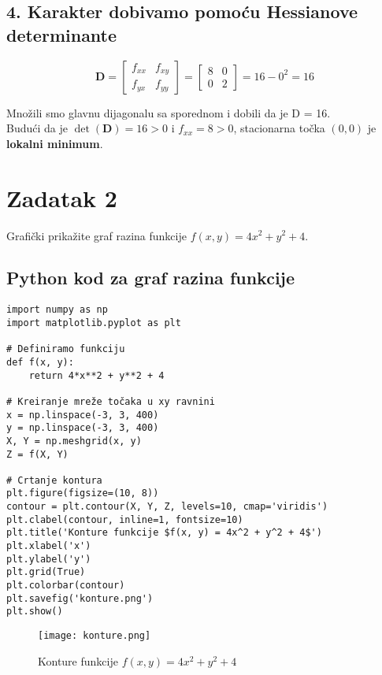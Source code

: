 \documentclass{article}
\begin{document}
\subsection*{4. Karakter dobivamo pomoću Hessianove determinante}

\[
\mathbf{D} = \begin{bmatrix}
f_{xx} & f_{xy} \\
f_{yx} & f_{yy}
\end{bmatrix} = \begin{bmatrix}
8 & 0 \\
0 & 2
\end{bmatrix} = 16 - 0^2 = 16
\]

Množili smo glavnu dijagonalu sa sporednom i dobili da je D = 16.\\

Budući da je \(\det(\mathbf{D}) = 16 > 0\) i \(f_{xx} = 8 > 0\), stacionarna točka \((0, 0)\) je \textbf{lokalni minimum}.

\section{Zadatak 2}

Grafički prikažite graf razina funkcije \( f(x, y) = 4x^2 + y^2 + 4 \).

\subsection*{Python kod za graf razina funkcije}

\begin{verbatim}
import numpy as np
import matplotlib.pyplot as plt

# Definiramo funkciju
def f(x, y):
    return 4*x**2 + y**2 + 4

# Kreiranje mreže točaka u xy ravnini
x = np.linspace(-3, 3, 400)
y = np.linspace(-3, 3, 400)
X, Y = np.meshgrid(x, y)
Z = f(X, Y)

# Crtanje kontura
plt.figure(figsize=(10, 8)) 
contour = plt.contour(X, Y, Z, levels=10, cmap='viridis')
plt.clabel(contour, inline=1, fontsize=10)
plt.title('Konture funkcije $f(x, y) = 4x^2 + y^2 + 4$')
plt.xlabel('x')
plt.ylabel('y')
plt.grid(True)
plt.colorbar(contour)
plt.savefig('konture.png') 
plt.show()
\end{verbatim}

\begin{figure}[h]
    \centering
    \texttt{[image: konture.png]}
    \caption{Konture funkcije $f(x, y) = 4x^2 + y^2 + 4$}
    \label{fig:contour_plot}
\end{figure}
\end{document}
